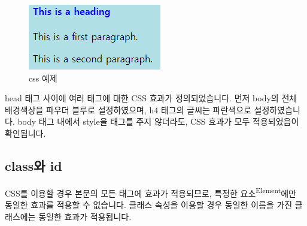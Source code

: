 \documentclass[12pt,]{book}
\begin{document}
\begin{figure}[h]

{\centering \includegraphics[width=0.7\linewidth]{images/html_8} 

}

\caption{css 예제}\label{fig:unnamed-chunk-20}
\end{figure}

head 태그 사이에 여러 태그에 대한 CSS 효과가 정의되었습니다. 먼저 body의 전체 배경색상을 파우더 블루로 설정하였으며, h4 태그의 글씨는 파란색으로 설정하였습니다. body 태그 내에서 style을 태그를 주지 않더라도, CSS 효과가 모두 적용되었음이 확인됩니다.

\hypertarget{class-id}{%
\subsection{class와 id}\label{class-id}}

CSS를 이용할 경우 본문의 모든 태그에 효과가 적용되므로, 특정한 요소\textsuperscript{Element}에만 동일한 효과를 적용할 수 없습니다. 클래스 속성을 이용할 경우 동일한 이름을 가진 클래스에는 동일한 효과가 적용됩니다.
\end{document}
